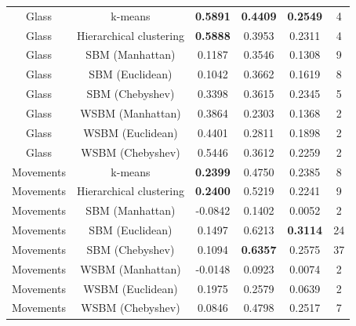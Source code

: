 \documentclass[conference]{IEEEtran}
\begin{document}
\begin{table}[t]
\begin{tabular}{c | c | c c c | c}
    \hline
    Glass & k-means & \textbf{0.5891} & \textbf{0.4409} & \textbf{0.2549} & 4 \\
    Glass & Hierarchical clustering & \textbf{0.5888} & 0.3953 & 0.2311 & 4 \\
    Glass & SBM (Manhattan) & 0.1187 & 0.3546 & 0.1308 & 9 \\
    Glass & SBM (Euclidean) & 0.1042 & 0.3662 & 0.1619 & 8 \\
    Glass & SBM (Chebyshev) & 0.3398 & 0.3615 & 0.2345 & 5 \\
    Glass & WSBM (Manhattan) & 0.3864 & 0.2303 & 0.1368 & 2 \\
    Glass & WSBM (Euclidean) & 0.4401 & 0.2811 & 0.1898 & 2 \\
    Glass & WSBM (Chebyshev) & 0.5446 & 0.3612 & 0.2259 & 2 \\

    \hline
    Movements & k-means & \textbf{0.2399} & 0.4750 & 0.2385 & 8 \\
    Movements & Hierarchical clustering & \textbf{0.2400} & 0.5219 & 0.2241 & 9 \\
    Movements & SBM (Manhattan) & -0.0842 & 0.1402 & 0.0052 & 2 \\
    Movements & SBM (Euclidean) & 0.1497 & 0.6213 & \textbf{0.3114} & 24 \\
    Movements & SBM (Chebyshev) & 0.1094 & \textbf{0.6357} & 0.2575 & 37 \\
    Movements & WSBM (Manhattan) & -0.0148 & 0.0923 & 0.0074 & 2 \\
    Movements & WSBM (Euclidean) & 0.1975 & 0.2579 & 0.0639 & 2 \\
    Movements & WSBM (Chebyshev) & 0.0846 & 0.4798 & 0.2517 & 7 \\



\end{tabular}
\end{table}
\end{document}
